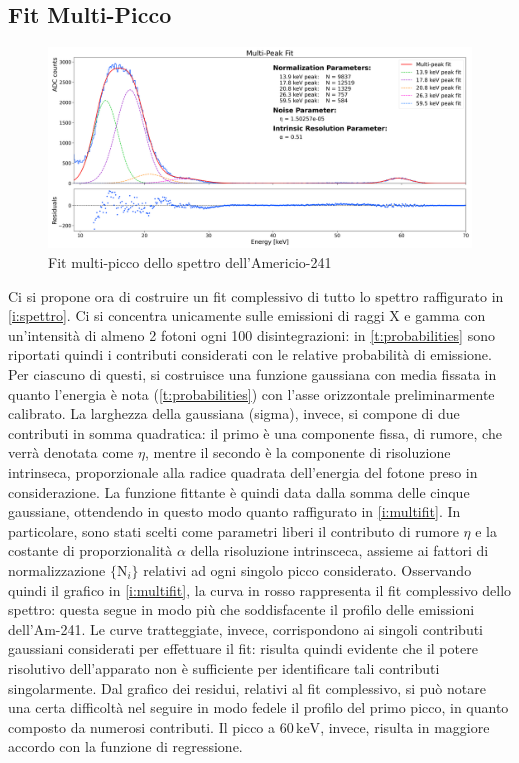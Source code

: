 \documentclass[twocolumn,10pt]{asme2ej}
\begin{document}
\subsection{Fit Multi-Picco}\label{s:multipicco}

\begin{figure}
    \centering
    \includegraphics[width=\textwidth]{../Plots/multifit.png}
   \caption{Fit multi-picco dello spettro dell'Americio-241}
    \label{i:multifit}
\end{figure}

Ci si propone ora di costruire un fit complessivo di tutto lo spettro raffigurato in \autoref{i:spettro}. Ci si
concentra unicamente sulle emissioni di raggi X e gamma con un'intensità di almeno 2 fotoni ogni 100 disintegrazioni: in
\autoref{t:probabilities} sono riportati quindi i contributi considerati con le relative probabilità di emissione. Per
ciascuno di questi, si costruisce una funzione gaussiana con media fissata in quanto l'energia è nota
(\autoref{t:probabilities}) con l'asse orizzontale preliminarmente calibrato. La larghezza della gaussiana (sigma),
invece, si compone di due contributi in somma quadratica: il primo è una componente fissa, di rumore, che verrà denotata
come $\eta$, mentre il secondo è la componente di risoluzione intrinseca, proporzionale alla radice quadrata
dell'energia del fotone preso in considerazione. La funzione fittante è quindi data dalla somma delle cinque gaussiane,
ottendendo in questo modo quanto raffigurato in \autoref{i:multifit}. In particolare, sono stati scelti come parametri
liberi il contributo di rumore $\eta$ e la costante di proporzionalità $\alpha$ della risoluzione intrinsceca, assieme
ai fattori di normalizzazione $\{\text{N}_i\}$ relativi ad ogni singolo picco considerato. Osservando quindi il grafico
in \autoref{i:multifit}, la curva in rosso rappresenta il fit complessivo dello spettro: questa segue in modo più che
soddisfacente il profilo delle emissioni dell'Am-241. Le curve tratteggiate, invece, corrispondono ai singoli contributi
gaussiani considerati per effettuare il fit: risulta quindi evidente che il potere risolutivo dell'apparato non è
sufficiente per identificare tali contributi singolarmente. Dal grafico dei residui, relativi al fit complessivo, si può
notare una certa difficoltà nel seguire in modo fedele il profilo del primo picco, in quanto composto da numerosi
contributi. Il picco a $60\,\si{\kilo\electronvolt}$, invece, risulta in maggiore accordo con la funzione di
regressione.
\end{document}
